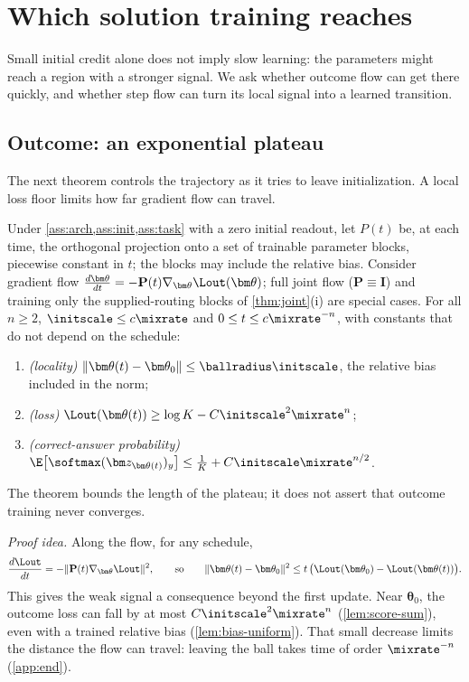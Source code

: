 \section{Which solution training reaches}
\label{sec:reach}

Small initial credit alone does not imply slow learning: the parameters might reach a region with a stronger signal. We ask
whether outcome flow can get there quickly, and whether step flow can turn its local signal into a learned transition.

\subsection{Outcome: an exponential plateau}

The next theorem controls the trajectory as it tries to leave initialization. A local loss floor limits how far gradient flow can travel.

\begin{theorem}
\label{thm:outcome-end}
Under \cref{ass:arch,ass:init,ass:task} with a zero initial readout, let $P(t)$ be, at each time, the orthogonal projection onto a set
of trainable parameter blocks, piecewise constant in $t$; the blocks may include the relative bias. Consider gradient flow
$\tfrac{d\bm\theta}{dt}=-\mathbf P(t)\nabla_{\bm\theta}\Lout(\bm\theta)$; full joint flow ($\mathbf P\equiv\mathbf I$) and training only the supplied-routing blocks of \cref{thm:joint}(i) are special cases.
For all $n\ge2$, $\initscale\le c\mixrate$ and $0\le t\le c\mixrate^{-n}$, with constants that do not depend on the schedule:
\begin{enumerate}[label=(\roman*),leftmargin=*,itemsep=0pt,topsep=2pt]
\item \emph{(locality)} $\|\bm\theta(t)-\bm\theta_0\|\le\ballradius\initscale$, the relative bias included in the norm;
\item \emph{(loss)} $\Lout(\bm\theta(t))\ge\log K-C\initscale^2\mixrate^n$;
\item \emph{(correct-answer probability)} $\E\bigl[\softmax(\bm z_{\bm\theta(t)})_y\bigr]\le\frac{1}{K}+C\initscale\mixrate^{n/2}$.
\end{enumerate}
\end{theorem}
The theorem bounds the length of the plateau; it does not assert that outcome training never converges.

\emph{Proof idea.} Along the flow, for any schedule,
\[
 \frac{d\Lout}{dt}=-\|\mathbf P(t)\nabla_{\bm\theta}\Lout\|^2,
 \qquad\text{so}\qquad
 \|\bm\theta(t)-\bm\theta_0\|^2\le t\,\bigl(\Lout(\bm\theta_0)-\Lout(\bm\theta(t))\bigr).
\]
This gives the weak signal a consequence beyond the first update. Near $\bm\theta_0$, the outcome loss can fall by at most
$C\initscale^2\mixrate^n$ (\cref{lem:score-sum}), even with a trained relative bias (\cref{lem:bias-uniform}). That small decrease limits
the distance the flow can travel: leaving the ball takes time of order $\mixrate^{-n}$ (\cref{app:end}).

